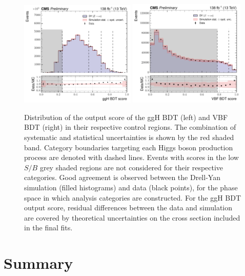 \begin{figure}[htbp!]
\centering
\includegraphics[width=0.49\textwidth]{Figures/Hee/ggH/validation/DY_validation_ggH_BDT_ggH_mva.pdf}\hfill%
\includegraphics[width=0.495\textwidth]{Figures/Hee/VBF/validation/DY_validation_VBF_BDT_VBF_mva.pdf}\hfill%
\caption[The output score distribution for the \ggH and VBF BDTs for \Zee events in the \Hee control region.]{Distribution of the output score of the ggH BDT (left) and VBF BDT (right) in their respective \Zee control regions. The combination of systematic and statistical uncertainties is shown by the red shaded band. Category boundaries targeting each Higgs boson production process are denoted with dashed lines. Events with scores in the low $S/B$ grey shaded regions are not considered for their respective categories. Good agreement is observed between the Drell-Yan simulation (filled histograms) and data (black points), for the phase space in which analysis categories are constructed.  For the ggH BDT output score, residual differences between the data and simulation are covered by theoretical uncertainties on the \ggH cross section included in the final fits.}
\label{fig:hee_ggh_vbf_validation}
\end{figure}

\section{Summary}
\label{hee_categorisation_summary}

